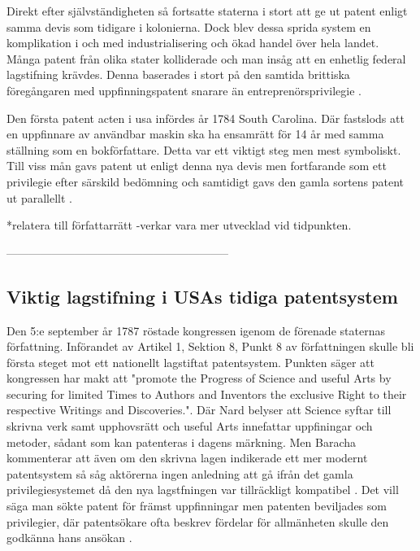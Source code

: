 Direkt efter självständigheten så fortsatte staterna i stort att ge ut patent enligt samma devis som tidigare i
kolonierna. Dock blev dessa sprida system en komplikation i och med industrialisering och ökad handel över
hela landet. Många patent från olika stater kolliderade och man insåg att en enhetlig federal
lagstifning krävdes. Denna baserades i stort på den samtida brittiska föregångaren med uppfinningspatent
snarare än entreprenörsprivilegie \cite{nard}.

Den första patent acten i usa infördes år 1784 South Carolina. Där fastslods att en uppfinnare av
användbar maskin ska ha ensamrätt för 14 år med samma ställning som en bokförfattare\cite{bracha}. Detta var ett viktigt steg men mest symboliskt. Till viss mån gavs patent ut enligt
denna nya devis men fortfarande som ett privilegie efter särskild bedömning och samtidigt gavs den gamla
sortens patent ut parallellt \cite{bracha}.

*relatera till författarrätt -verkar vara mer utvecklad vid tidpunkten.


-----------------------------------------------------------

\subsection{Viktig lagstifning i USAs tidiga patentsystem}

Den 5:e september år 1787 röstade kongressen igenom de förenade staternas författning. Införandet av Artikel 1, Sektion 8, Punkt 8 av författningen skulle bli första steget mot ett nationellt lagstiftat patentsystem. Punkten säger att kongressen har
makt att "promote the Progress of Science and useful Arts by securing for limited Times to Authors and
Inventors the exclusive Right to their respective Writings and Discoveries.". Där Nard belyser att
Science syftar till skrivna verk samt upphovsrätt och useful Arts innefattar uppfiningar och metoder,
sådant som kan patenteras i dagens märkning\cite{nard}. Men Baracha kommenterar att även om den skrivna lagen indikerade ett mer modernt patentsystem så såg aktörerna ingen anledning att gå ifrån det gamla privilegiesystemet då den nya lagstfningen var tillräckligt kompatibel \cite{Bracha}. Det vill säga man sökte patent för främst uppfinningar men patenten beviljades som privilegier, där patentsökare ofta beskrev fördelar för allmänheten skulle den godkänna hans ansökan \cite{bracha}.

